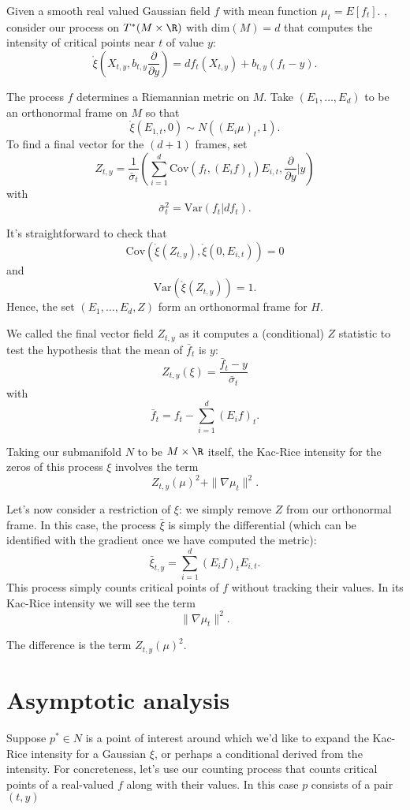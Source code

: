 \documentclass{article}
\newcommand{\jt}[1]{{\bf{{\red{[{JT: #1}]}}}}}
\newcommand{\randsec}{\xi}
\newcommand{\linprocess}{\mathring{\randsec}}
\begin{document}
Given a smooth real valued Gaussian field $f$ with mean
function $\mu_t=E[f_t]$. , consider our process on $T^*(M \times \R)$ with $\text{dim}(M)=d$
that computes
the intensity of critical points near $t$ of value $y$:
$$
\linprocess\left(X_{t,y}, b_{t,y} \frac{\partial}{\partial y} \right) =  df_t(X_{t,y}) + b_{t,y}(f_t - y) .
$$

The process $f$ determines a Riemannian metric on $M$. Take $(E_1, \dots, E_d)$ to be an orthonormal
frame on $M$ so that
$$
\linprocess(E_{1,t}, 0) \sim N((E_{i}\mu)_t, 1).
$$
To find a final vector for the $(d+1)$ frames, set
$$
Z_{t,y} = \frac{1}{\bar{\sigma}_t}\left( \sum_{i=1}^d \text{Cov}(f_t, (E_if)_t) E_{i,t}, \frac{\partial}{\partial y} \biggl|y \right)
$$
with
$$
\bar{\sigma}^2_t = \text{Var}(f_t|df_t).
$$

It's straightforward to check that
$$\text{Cov}(\linprocess(Z_{t,y}), \linprocess(0, E_{i,t})) = 0$$ and
$$
\text{Var}(\linprocess(Z_{t,y}))=1.
$$
Hence, the set $(E_1,\dots, E_d, Z)$ form an orthonormal frame for $H$.

We called the final vector field $Z_{t,y}$ as it computes a (conditional) $Z$ statistic to test the
hypothesis that the mean of $\bar{f}_t$ is $y$:
$$
Z_{t,y}(\randsec) = \frac{\bar{f}_t - y}{\bar{\sigma}_t}
$$
with
$$
\bar{f}_t = f_t - \sum_{i=1}^d (E_if)_t.
$$

Taking our submanifold $N$ to be  $M \times \R$ itself, 
the Kac-Rice intensity for the zeros of this process $\randsec$ involves the term
$$
Z_{t,y}(\mu)^2 + \|\nabla \mu_t\|^2.
$$

Let's now consider a restriction of $\randsec$: we simply remove $Z$ from our orthonormal frame. In this case,
the process $\bar{\randsec}$ is simply the differential (which can be identified with the gradient once
we have computed the metric):
$$
\bar{\randsec}_{t,y} = \sum_{i=1}^d (E_if)_t E_{i,t}.
$$
This process simply counts critical points of $f$ without tracking their values. In its Kac-Rice
intensity we will see the term
$$
\|\nabla \mu_t\|^2.
$$

The difference is the term $Z_{t,y}(\mu)^2$. \jt{This is the source of goldilocks!}

\section{Asymptotic analysis}

Suppose $p^* \in N$ is a point of interest around which we'd like to expand the Kac-Rice intensity for a
Gaussian $\randsec$, or perhaps a conditional derived from the intensity. For concreteness, let's use our
counting process that counts critical points of a real-valued $f$ along with their values. In this
case $p$ consists of a pair $(t,y)$ 
\end{document}
